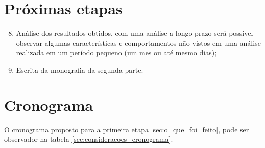\section{Próximas etapas}\label{sec:proximas_etapas}


\begin{enumerate}[label=\textnormal{(\arabic*)}]
  \setcounter{enumi}{7}
    \item Análise dos resultados obtidos, com uma análise a longo prazo será possível observar algumas características e comportamentos não vistos em uma análise realizada em um período pequeno (um mes ou até mesmo dias);
    \item Escrita da monografia da segunda parte.
    \label{itm:1}
\end{enumerate}

\section{Cronograma}
\label{cro}

O cronograma proposto para a primeira etapa \ref{sec:o_que_foi_feito}, pode ser observador na tabela \ref{sec:consideracoes_cronograma}.


